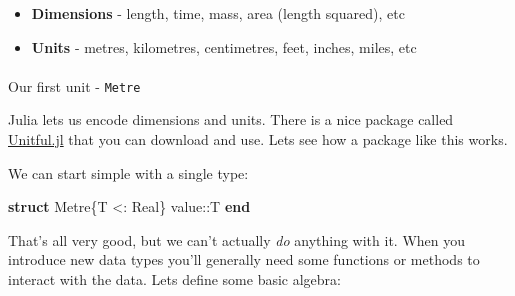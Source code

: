 \documentclass[
]{article}
\makeatletter
\let\oldparagraph\paragraph
\renewcommand{\paragraph}{
    \@ifstar
      \xxxParagraphStar
      \xxxParagraphNoStar
  }
\newcommand{\xxxParagraphStar}[1]{\oldparagraph*{#1}\mbox{}}
\newcommand{\xxxParagraphNoStar}[1]{\oldparagraph{#1}\mbox{}}
\newenvironment{Shaded}{\begin{snugshade}}{\end{snugshade}}
\newcommand{\DataTypeTok}[1]{\textcolor[rgb]{0.68,0.00,0.00}{#1}}
\newcommand{\KeywordTok}[1]{\textcolor[rgb]{0.00,0.23,0.31}{\textbf{#1}}}
\newcommand{\NormalTok}[1]{\textcolor[rgb]{0.00,0.23,0.31}{#1}}
\newcommand{\OperatorTok}[1]{\textcolor[rgb]{0.37,0.37,0.37}{#1}}
\providecommand{\tightlist}{%
  \setlength{\itemsep}{0pt}\setlength{\parskip}{0pt}}
\makeatother
\begin{document}
\begin{itemize}
\tightlist
\item
  \textbf{Dimensions} - length, time, mass, area (length squared), etc
\item
  \textbf{Units} - metres, kilometres, centimetres, feet, inches, miles,
  etc
\end{itemize}

\paragraph{\texorpdfstring{Our first unit -
\texttt{Metre}}{Our first unit - Metre}}\label{our-first-unit---metre}

Julia lets us encode dimensions and units. There is a nice package
called
\href{https://painterqubits.github.io/Unitful.jl/stable/}{Unitful.jl}
that you can download and use. Lets see how a package like this works.

We can start simple with a single type:

\begin{Shaded}
\begin{Highlighting}[]
\KeywordTok{struct}\NormalTok{ Metre\{T }\OperatorTok{\textless{}:}\DataTypeTok{ Real}\NormalTok{\}}
\NormalTok{   value}\OperatorTok{::}\DataTypeTok{T}
\KeywordTok{end}
\end{Highlighting}
\end{Shaded}

That's all very good, but we can't actually \emph{do} anything with it.
When you introduce new data types you'll generally need some functions
or methods to interact with the data. Lets define some basic algebra:
\end{document}
